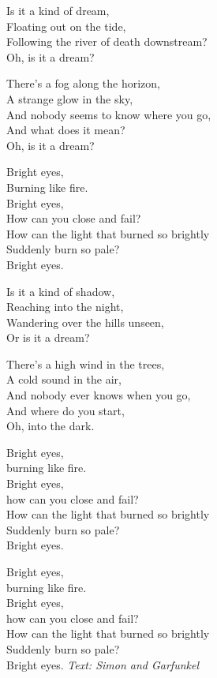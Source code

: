 \vspace{10pt}
Is it a kind of dream,\\
Floating out on the tide,\\
Following the river of death downstream?\\
Oh, is it a dream?\par
\vspace{10pt}
There's a fog along the horizon,\\
A strange glow in the sky,\\
And nobody seems to know where you go,\\
And what does it mean?\\
Oh, is it a dream?\par
\vspace{10pt}
Bright eyes,\\
Burning like fire.\\
Bright eyes,\\
How can you close and fail?\\
How can the light that burned so brightly\\
Suddenly burn so pale?\\
Bright eyes.\par
\vspace{10pt}
Is it a kind of shadow,\\
Reaching into the night,\\
Wandering over the hills unseen,\\
Or is it a dream?\par
\vspace{10pt}
There's a high wind in the trees,\\
A cold sound in the air,\\
And nobody ever knows when you go,\\
And where do you start,\\
Oh, into the dark.\par
\vspace{10pt}
Bright eyes,\\
burning like fire.\\
Bright eyes,\\
how can you close and fail?\\
How can the light that burned so brightly\\
Suddenly burn so pale?\\
Bright eyes.\par
\vspace{10pt}
Bright eyes,\\
burning like fire.\\
Bright eyes,\\
how can you close and fail?\\
How can the light that burned so brightly\\
Suddenly burn so pale?\\
Bright eyes.
\vspace{10pt}
{\footnotesize\textit{Text: Simon and Garfunkel}}
